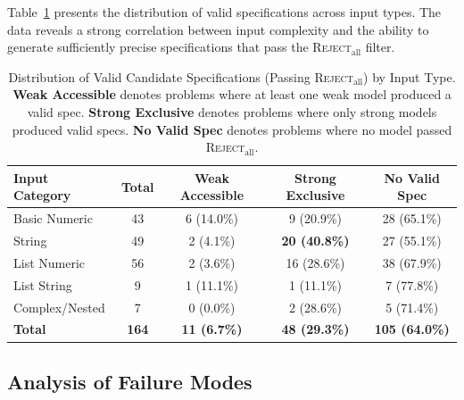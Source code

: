 Table~\ref{tab:input-type-breakdown} presents the distribution of valid specifications across input types. The data reveals a strong correlation between input complexity and the ability to generate sufficiently precise specifications that pass the \textsc{Reject}$_{\text{all}}$ filter.

\begin{table}[ht]
  \caption{Distribution of Valid Candidate Specifications (Passing \textsc{Reject}$_{\text{all}}$) by Input Type. \textbf{Weak Accessible} denotes problems where at least one weak model produced a valid spec. \textbf{Strong Exclusive} denotes problems where only strong models produced valid specs. \textbf{No Valid Spec} denotes problems where no model passed \textsc{Reject}$_{\text{all}}$.}
  \label{tab:input-type-breakdown}
  \begin{center}
    \begin{small}
      \begin{sc}
        \begin{tabular}{lcccc}
          \toprule
          Input Category & Total & Weak Accessible & Strong Exclusive & No Valid Spec \\
          \midrule
          Basic Numeric   & 43 & 6 (14.0\%) & 9 (20.9\%)           & 28 (65.1\%) \\
          String          & 49 & 2 (4.1\%)  & \textbf{20 (40.8\%)} & 27 (55.1\%) \\
          List Numeric    & 56 & 2 (3.6\%)  & 16 (28.6\%)          & 38 (67.9\%) \\
          List String     & 9  & 1 (11.1\%) & 1 (11.1\%)           & 7 (77.8\%)  \\
          Complex/Nested  & 7  & 0 (0.0\%)  & 2 (28.6\%)           & 5 (71.4\%)  \\
          \midrule
          \textbf{Total}  & \textbf{164} & \textbf{11 (6.7\%)} & \textbf{48 (29.3\%)} & \textbf{105 (64.0\%)} \\
          \bottomrule
        \end{tabular}
      \end{sc}
    \end{small}
  \end{center}
  \vskip -0.1in
\end{table}

\subsection{Analysis of Failure Modes}

